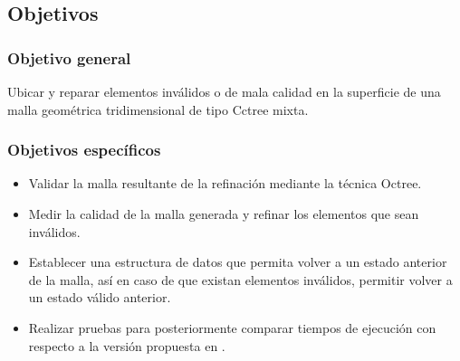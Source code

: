 \subsection{Objetivos}
\subsubsection{Objetivo general}
Ubicar y reparar elementos inválidos o de mala calidad en la superficie de una malla geométrica tridimensional de tipo Cctree mixta.

\subsubsection{Objetivos específicos}
\begin{itemize}
    \item Validar la malla resultante de la refinación mediante la técnica Octree.
    \item Medir la calidad de la malla generada y refinar los elementos que sean inválidos.
    \item Establecer una estructura de datos que permita volver a un estado anterior de la malla, así en caso de que existan elementos inválidos, permitir volver a un estado válido anterior.
    \item Realizar pruebas para posteriormente comparar tiempos de ejecución con respecto a la versión propuesta en \cite{daines2018repairing}.
\end{itemize}

